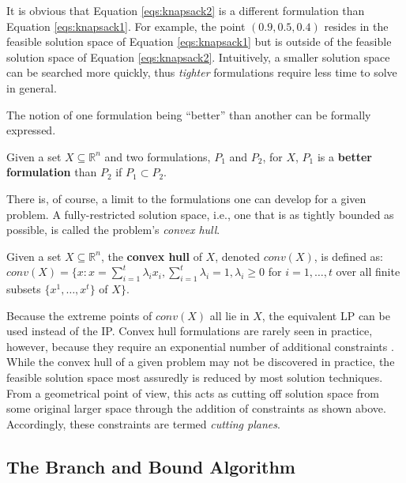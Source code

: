 It is obvious that Equation \ref{eqs:knapsack2} is a different formulation than
Equation \ref{eqs:knapsack1}. For example, the point $(0.9, 0.5, 0.4)$ resides
in the feasible solution space of Equation \ref{eqs:knapsack1} but is outside of
the feasible solution space of Equation \ref{eqs:knapsack2}. Intuitively, a
smaller solution space can be searched more quickly, thus \textit{tighter}
formulations require less time to solve in general.

The notion of one formulation being ``better'' than another can be formally
expressed.

\begin{define}
Given a set $X \subseteq \mathbb{R}^n$ and two formulations, $P_1$ and $P_2$,
for $X$, $P_1$ is a \textbf{better formulation} than $P_2$ if $P_1 \subset P_2$.
\end{define}

There is, of course, a limit to the formulations one can develop for a given
problem. A fully-restricted solution space, i.e., one that is as tightly bounded
as possible, is called the problem's \textit{convex hull}. 

\begin{define}
Given a set $X \subseteq \mathbb{R}^n$, the \textbf{convex hull} of $X$, denoted
$conv(X)$, is defined as: $conv(X) = \{x : x = \sum_{i=1}^{t} \lambda_i
x_i, \sum_{i=1}^{t} \lambda_i = 1, \lambda_i \geq 0$ for $i = 1, \ldots, t$ over
all finite subsets $\{x^1, \ldots, x^t \}$ of $X\}$.
\end{define}

Because the extreme points of $conv(X)$ all lie in $X$, the equivalent LP can be
used instead of the IP. Convex hull formulations are rarely seen in practice,
however, because they require an exponential number of additional
constraints \cite{wolsey_integer_1998}. While the convex hull of a given problem
may not be discovered in practice, the feasible solution space most assuredly is
reduced by most solution techniques. From a geometrical point of view, this acts
as cutting off solution space from some original larger space through the
addition of constraints as shown above. Accordingly, these constraints are
termed \textit{cutting planes}.

\subsection{The Branch and Bound Algorithm}\label{sec:bnb}

